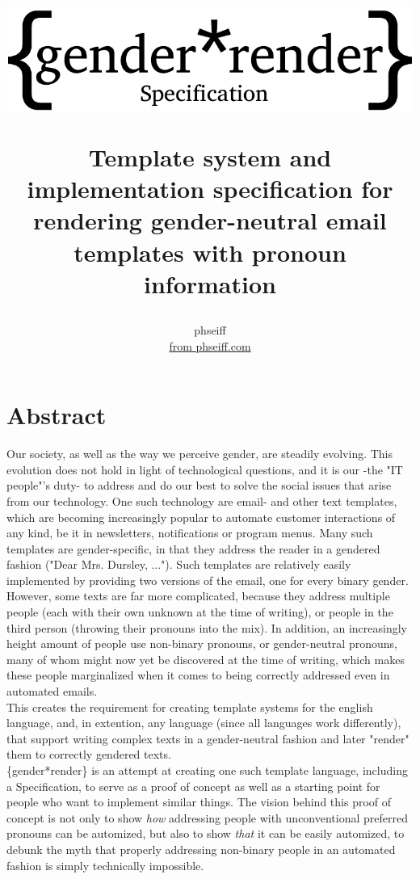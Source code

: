 \documentclass{article}
\author{phseiff\\ \href{https://phseiff.com}{from phseiff.com}\\ {\href{https://phseiff.com/gender-render/spec.html}{\version}}}
\title{\begin{center}
           \includegraphics{images/title-black.pdf}
\end{center} Template system and implementation specification for rendering gender-neutral email templates with pronoun information}
\begin{document}
\maketitle
\tableofcontents

\section{Abstract}

    Our society, as well as the way we perceive gender, are steadily evolving.
    This evolution does not hold in light of technological questions, and it is our -the "IT people"'s duty- to address and do our best to solve the social issues that arise from our technology.
    One such technology are email- and other text templates, which are becoming increasingly popular to automate customer interactions of any kind, be it in newsletters, notifications or program menus.
    Many such templates are gender-specific, in that they address the reader in a gendered fashion ("Dear Mrs. Dursley, ...").
    Such templates are relatively easily implemented by providing two versions of the email, one for every binary gender.
    However, some texts are far more complicated, because they address multiple people (each with their own unknown at the time of writing), or people in the third person (throwing their pronouns into the mix).
    In addition, an increasingly height amount of people use non-binary pronouns, or gender-neutral pronouns, many of whom might now yet be discovered at the time of writing, which makes these people marginalized when it comes to being correctly addressed even in automated emails.\\

    This creates the requirement for creating template systems for the english language, and, in extention, any language (since all languages work differently), that support writing complex texts in a gender-neutral fashion and later "render" them to correctly gendered texts.\\

    \{gender*render\} is an attempt at creating one such template language, including a Specification, to serve as a proof of concept as well as a starting point for people who want to implement similar things.
    The vision behind this proof of concept is not only to show \emph{how} addressing people with unconventional preferred pronouns can be automized, but also to show \emph{that} it can be easily automized, to debunk the myth that properly addressing non-binary people in an automated fashion is simply technically impossible.
\end{document}
